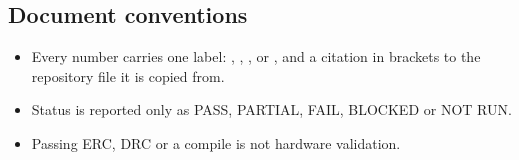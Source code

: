 \subsection{Document conventions}
\begin{itemize}[noitemsep]
  \item Every number carries one label: , ,
        ,  or , and a citation
        in brackets to the repository file it is copied from.
  \item Status is reported only as PASS, PARTIAL, FAIL, BLOCKED or NOT RUN.
  \item Passing ERC, DRC or a compile is not hardware validation.
\end{itemize}
